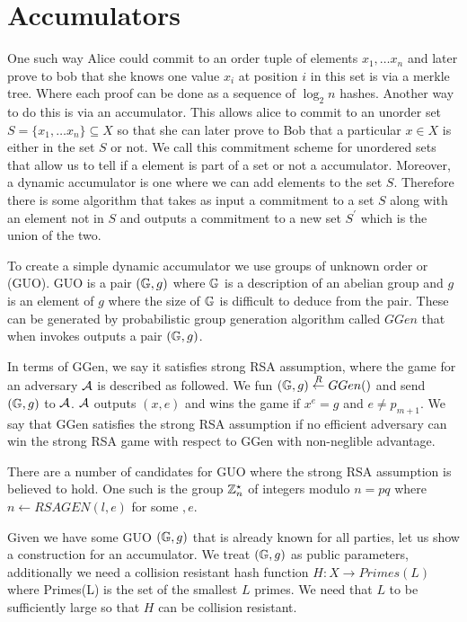 \section{Accumulators}

One such way Alice could commit to an order tuple of elements \(x_1, \ldots x_n \) and later prove to bob that she knows one value \(x_i\) at position \(i\)  in this set is via a merkle tree. Where each proof can be done as a sequence of \(\log_2 n\) hashes. 
Another way to do this is via an accumulator. This allows alice to commit to an unorder set \(S= \{x_1, \ldots  x_n \} \subseteq X \) so that she can later prove to Bob that a particular \(x \in X\) is either in the set \(S\) or not. We call this commitment scheme for unordered sets that allow us to tell if a element is part of a set or not a accumulator.  Moreover, a dynamic accumulator is one where we can add elements to the set \(S\). Therefore  there is some algorithm that takes as input a commitment to a set \(S\) along with an element not in \(S\) and outputs a commitment to a new set \(S^\prime \) which is the union of the two. 

To create a simple dynamic accumulator we use groups of unknown order or (GUO). GUO is a pair \((\mathbb{G}, g)\) where \(\mathbb{G}\) is a description of an abelian group and \(g\) is an element of \(g\) where the size of \(\mathbb{G}\) is difficult to deduce from the pair.  These can be generated by probabilistic group generation algorithm called \(GGen\) that when invokes outputs a pair \((\mathbb{G}, g)\). 

In terms of GGen, we say it satisfies strong RSA assumption, where the game for an adversary \(\mathcal{A}\) is described as followed. We fun \((\mathbb{G}, g) \overset{R}{\gets} GGen()\) and send \((\mathbb{G}, g)\) to \(\mathcal{A}\).  \(\mathcal{A}\) outputs \((x,e)\) and wins the game if \(x^e =g\) and \(e \neq p_{m+1}\). We say that GGen satisfies the strong RSA assumption if no efficient adversary can win the strong RSA game with respect to GGen with non-neglible advantage. 

There are a number of candidates for GUO where the strong RSA assumption is  believed to hold. One such is the group \(\mathbb{Z}_n^{\star}\) of integers modulo \(n= pq\) where \( n \gets RSAGEN(l, e)\) for some \(, e\). 

Given we have some GUO \((\mathbb{G}, g)\) that is already known for all parties, let us show a construction for an accumulator. We treat \((\mathbb{G}, g)\) as public parameters, additionally we need a collision resistant hash function \(H: X \to Primes(L) \) where Primes(L) is the set of the smallest \(L\) primes. We need that \(L\) to be sufficiently large so that \(H\) can be collision resistant. 

